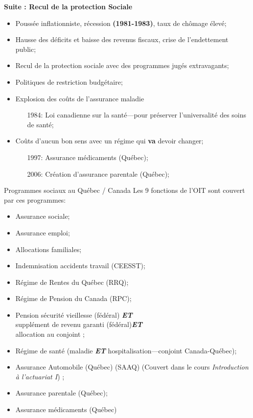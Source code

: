 \documentclass[10pt, french]{article}
\begin{document}
\begin{multicols*}{3}
\textbf{Suite : Recul de la protection Sociale}
\begin{itemize}
	\item	Poussée inflationniste, récession \textbf{(1981-1983)}, taux de chômage élevé;
	\item	Hausse des déficits et baisse des revenus fiscaux, crise de l'endettement public;
	\item	Recul de la protection sociale avec des programmes jugés extravagants;
	\item	Politiques de restriction budgétaire;
	\item	Explosion des coûts de l'assurance maladie
		\begin{itemize}
		\item[1984: ]	Loi canadienne sur la santé---pour préserver l'universalité des soins de santé;
		\end{itemize}
	\item	Coûts d'aucun \og bon sens \fg{} avec un régime qui \textbf{va} devoir changer;
		\begin{itemize}
		\item[1997:]	Assurance médicaments (\textcolor{blue(pigment)}{Québec});
		\item[2006:]	Création d'assurance parentale (\textcolor{blue(pigment)}{Québec});
		\end{itemize}
\end{itemize}


\begin{conceptgen}{Programmes sociaux au Québec / Canada}
Les 9 fonctions de l'OIT sont couvert par ces programmes:
\begin{itemize}
	\item	Assurance sociale;
	\item	Assurance emploi;
	\item	Allocations familiales;
	\item	Indemnisation accidents travail (CEESST);
	\item	Régime de Rentes du Québec (RRQ);
	\item	Régime de Pension du Canada (RPC);
	\item	Pension sécurité vieillesse (\textcolor{bulgarianrose}{fédéral}) \textbf{\textit{ET}}\\ supplément de revenu garanti (\textcolor{bulgarianrose}{fédéral})\textbf{\textit{ET}}\\ allocation au conjoint ;
	\item	Régime de santé (maladie \textbf{\textit{ET}} hospitalisation---conjoint Canada-Québec);
	\item	\textcolor{amaranth}{Assurance Automobile (\textcolor{blue(pigment)}{Québec}) (SAAQ) (Couvert dans le cours \textit{Introduction à l'actuariat I})} ;
	\item	Assurance parentale (\textcolor{blue(pigment)}{Québec});
	\item	Assurance médicaments (\textcolor{blue(pigment)}{Québec})
\end{itemize}
\end{conceptgen}


\end{multicols*}
\end{document}
